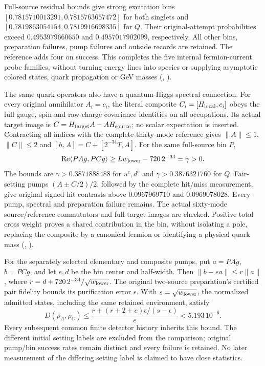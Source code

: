 Full-source residual bounds give strong excitation bins
$[0.7815710013291,0.7815763657472]$ for both singlets and
$[0.7819863054154,0.7819916698335]$ for $Q$.
Their original-attempt probabilities exceed $0.4953979660650$ and
$0.4957017902099$, respectively. All other bins, preparation failures,
pump failures and outside records are retained. The reference adds four
on success. This completes the five internal fermion-current probe
families, without turning energy lines into species or supplying
asymptotic colored states, quark propagation or GeV masses
(, \cite{ophrepo}).

The same quark operators also have a quantum-Higgs spectral connection.
For every original annihilator $A_i=c_i$, the literal composite
$C_i=[H_{\rm local},c_i]$ obeys the full gauge, spin and raw-charge
covariance identities on all occupations. Its actual target image is
$C=H_{\rm target}A-AH_{\rm source}$; no scalar expectation is inserted.
Contracting all indices with the complete thirty-mode reference gives
$\|A\|\le1$, $\|C\|\le2$ and
$[h,A]=C+[2^{-34}T,A]$. For the same full-source bin $P$,
\[
 \operatorname{Re}\langle PAg,PCg\rangle
 \ge Lw_{\rm lower}-720\,2^{-34}=\gamma>0.
\]
The bounds are $\gamma>0.3871888488$ for $u^c,d^c$ and
$\gamma>0.3876321760$ for $Q$. Fair-setting pumps
$(A\pm C/2)/2$, followed by the complete hit/miss measurement, give
original signed hit contrasts above $0.0967969710$ and $0.0969078028$.
Every pump, spectral and preparation failure remains. The actual
sixty-mode source/reference commutators and full target images are checked.
Positive total cross weight proves a shared contribution in the bin,
without isolating a pole, replacing the composite by a canonical fermion
or identifying a physical quark mass
(, \cite{ophrepo}).

For the separately selected elementary and composite pumps, put
$a=PAg$, $b=PCg$, and let $e,d$ be the bin center and half-width.
Then $\|b-ea\|\le r\|a\|$, where
$r=d+720\,2^{-34}/\sqrt{w_{\rm lower}}$.
The original two-source preparation's certified pair fidelity bounds
its purification error $\epsilon$. With $s=\sqrt{w_{\rm lower}}$,
the normalized admitted states, including the same retained environment,
satisfy
\[
 D(\rho_A,\rho_C)\le
 \frac{r+(r+2+e)\epsilon/(s-\epsilon)}{e}<5.193\,10^{-6}.
\]
Every subsequent common finite detector history inherits this bound.
The different initial setting labels are excluded from the comparison;
original pump/bin success rates remain distinct and every failure is
retained. No later measurement of the differing setting label is claimed
to have close statistics.

